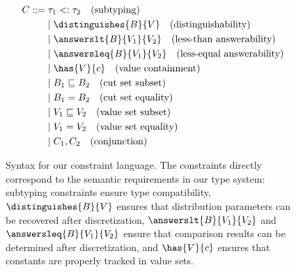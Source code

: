 \begin{figure}[!t]
    \begin{align*}
    C ::= &\; \tau_1 <: \tau_2  \text{\quad (subtyping)} \\
          &\mid \distinguishes{B}{V}  \text{\quad (distinguishability)} \\
          &\mid \answerslt{B}{V_1}{V_2}  \text{\quad (less-than answerability)} \\
          &\mid \answersleq{B}{V_1}{V_2}  \text{\quad (less-equal answerability)} \\
          &\mid \has{V}{c}  \text{\quad (value containment)} \\
          &\mid B_1 \sqsubseteq B_2  \text{\quad (cut set subset)} \\
          &\mid B_1 = B_2  \text{\quad (cut set equality)} \\
          &\mid V_1 \sqsubseteq V_2  \text{\quad (value set subset)} \\
          &\mid V_1 = V_2  \text{\quad (value set equality)} \\
          &\mid C_1, C_2   \text{\quad (conjunction)}
    \end{align*}
\caption{Syntax for our constraint language. The constraints directly correspond to the semantic requirements in our type system: subtyping constraints ensure type compatibility, $\distinguishes{B}{V}$ ensures that distribution parameters can be recovered after discretization, $\answerslt{B}{V_1}{V_2}$ and $\answersleq{B}{V_1}{V_2}$ ensure that comparison results can be determined after discretization, and $\has{V}{c}$ ensures that constants are properly tracked in value sets.}
\label{fig:constraints-grammar}
\end{figure}



